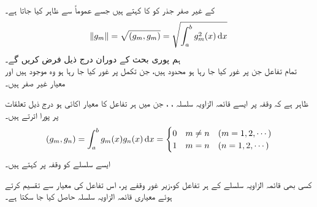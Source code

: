  کے غیر صفر جذر کو  کا  کہتے ہیں جسے عموماً  سے ظاہر کیا جاتا ہے۔
\begin{align}
\norm{g_m}=\sqrt{(g_m,g_m)}=\sqrt{\int_{a}^{b} g_m^2(x)\dif x}
\end{align}
ہم پوری بحث کے دوران درج ذیل فرض کریں گے۔\\
 \quad تمام تفاعل جن پر غور کیا جا رہا ہو محدود ہیں، جن تکمل پر غور کیا جا رہا ہو وہ موجود ہیں اور معیار غیر صفر ہیں۔

 ظاہر ہے کہ وقفہ  پر ایسے قائمہ الزاویہ سلسلہ ، ،  جن  میں ہر تفاعل کا معیار اکائی  ہو درج ذیل تعلقات پر پورا اترتے ہیں۔
\begin{align}
(g_m,g_n)=\int_{a}^{b}g_m(x) g_n(x)\dif x=
\begin{cases}
0 & m\ne n \quad (m=1,2,\cdots)\\
1& m=n \quad (n=1,2,\cdots)
\end{cases}
\end{align}
ایسے سلسلے کو وقفہ  پر  کہتے ہیں۔

کسی بھی قائمہ الزاویہ سلسلے کے ہر تفاعل کو،زیر غور وقفے پر، اس تفاعل کی  معیار سے تقسیم کرتے ہوئے معیاری قائمہ الزاویہ سلسلہ حاصل کیا جا سکتا ہے۔ 

